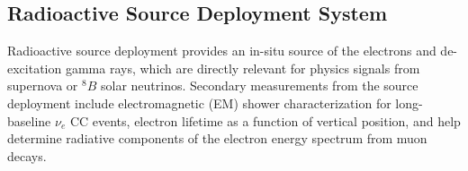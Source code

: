 \subsection{Radioactive Source Deployment System}%
\label{sec:calibrs}

Radioactive source deployment provides an in-situ source of the electrons and de-excitation gamma rays, which are directly relevant for physics signals from supernova or $^{8}B$ solar neutrinos. Secondary measurements from the source deployment include electromagnetic (EM) shower characterization for long-baseline $\nu_e$ CC events, electron lifetime as a function of  vertical position, and help determine radiative components of the electron energy spectrum from muon decays.




